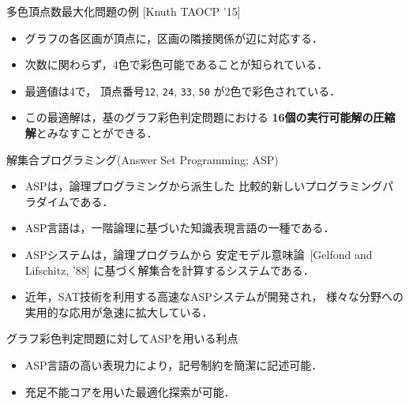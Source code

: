 \documentclass[dvipdfmx,11pt]{beamer}
\newcommand{\code}[1]{\lstinline[basicstyle=\ttfamily]{#1}}
\begin{document}
\begin{frame}{多色頂点数最大化問題の例 [Knuth TAOCP '15]}
 \begin{itemize}
 \item グラフの各区画が頂点に，区画の隣接関係が辺に対応する．
 \item 次数に関わらず，4色で彩色可能であることが知られている．
 \item 最適値は4で，
   頂点番号\code{12}, \code{24}, \code{33}, \code{50}
   が2色で彩色されている．
 \item この最適解は，基のグラフ彩色判定問題における
   \alert{\bf 16個の実行可能解の圧縮解}とみなすことができる．
 \end{itemize}
\end{frame}
\begin{frame}{解集合プログラミング(Answer Set Programming; ASP)}
 \begin{itemize}
  \item \alert{ASP}は，論理プログラミングから派生した
        比較的新しいプログラミングパラダイムである．
  \item \alert{ASP言語}は，一階論理に基づいた知識表現言語の一種である．
  \item \alert{ASPシステム}は，論理プログラムから
        安定モデル意味論~{\scriptsize[Gelfond and Lifschitz, '88]}
        に基づく解集合を計算するシステムである．
  \item 近年，SAT技術を利用する高速なASPシステムが開発され，
        様々な分野への実用的な応用が急速に拡大している．
 \end{itemize}
 
 \begin{alertblock}{グラフ彩色判定問題に対してASPを用いる利点}
  \begin{itemize}
   \item ASP言語の高い表現力により，記号制約を簡潔に記述可能．
   \item 充足不能コアを用いた最適化探索が可能．
  \end{itemize}
 \end{alertblock}
\end{frame}
\end{document}
